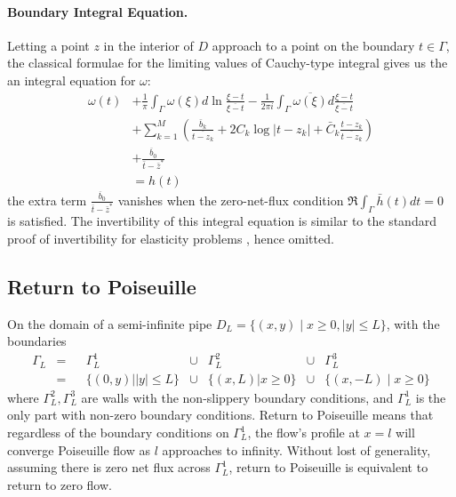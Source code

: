 \documentclass[10pt,twocolumn]{article}
\begin{document}
\paragraph*{Boundary Integral Equation.} 
Letting a point $z$ in the interior of $D$ approach to a point on the boundary $t\in \Gamma$, 
the classical formulae for the limiting values of Cauchy-type integral 
gives us the an integral equation for $\omega$:
\begin{align}
  \omega(t) 
  &+ \frac 1{\pi } \int_{\Gamma} \omega(\xi) d\ln \frac{\xi - t}{\overline{\xi - t}} - \frac 1{2\pi i} \int_\Gamma \overline{\omega(\xi)} d \frac{\xi - t}{\overline{\xi - t}} \label{bie} \\
  &+ \sum_{k=1}^M \left( \frac{\bar b_k}{\overline{t- z_k}} +  2C_k \log |t-z_k| + \bar C_k \frac{t-z_k}{\overline{ t - z_k}} \right) \nonumber\\
  &+ \frac{\overline b_0}{\bar t - \bar z^*} \nonumber \\
  &= h(t) \nonumber
\end{align}
the extra term $\frac{\overline b_0}{\bar t - \bar z^*}$ vanishes when the zero-net-flux condition $\Re \int_\Gamma \bar h(t) dt = 0$ is satisfied. 
The invertibility of this integral equation is similar 
to the standard proof of invertibility for elasticity problems \cite{muskhelishviliBasicProblemsMathematical1977}, hence omitted.

\subsection{Return to Poiseuille\label{sec:ret2poi}} 

On the domain of a semi-infinite pipe $D_L = \{(x,y)\mid x \ge 0, |y| \le L\}$, with the boundaries 
\begin{align}
  \Gamma_L &=&& \Gamma_L^1\quad\quad\quad& \cup &\Gamma_L^2 &\cup&\Gamma_L^3 \\
  &=&&\{(0,y)||y| \le L \}& \cup &\{(x,L)|x\ge 0\} &\cup& \{(x,-L)\mid x\ge 0\}\nonumber
\end{align}
where $\Gamma_L^2,\Gamma_L^3$ are walls with the non-slippery boundary conditions, 
and $\Gamma_L^1$ is the only part with non-zero boundary conditions. 
Return to Poiseuille means that regardless of the boundary conditions on $\Gamma_L^1$,
the flow's profile at $x = l$ will converge Poiseuille flow as $l$ approaches to infinity. Without lost of generality, assuming there is zero net flux across $\Gamma_L^1$,
return to Poiseuille is equivalent to return to zero flow. 
\end{document}
